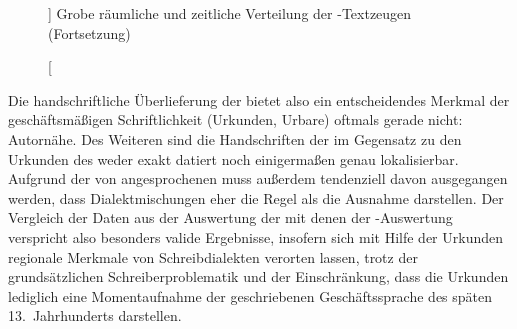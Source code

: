 {\begin{landscape}
\begin{figure}
\ContinuedFloat
{}
\caption%
	[]
	{Grobe räumliche und zeitliche Verteilung der \KC{}-Textzeugen
		(Fortsetzung)\nocite{wiesinger1983:rede}
	}
\end{figure}
\end{landscape}%
}

Die handschriftliche Überlieferung der \KC{} bietet also ein
entscheidendes Merkmal der geschäftsmäßigen Schriftlichkeit (Urkunden, Urbare)
oftmals gerade nicht: Autornähe. Des Weiteren sind die Handschriften der
\KC{} im Gegensatz zu den Urkunden des \CAO{} weder exakt datiert
noch einigermaßen genau lokalisierbar. Aufgrund der von
\citet[1310]{wegera2000} angesprochenen  muss außerdem
tendenziell davon ausgegangen werden, dass Dialekt\-mischungen eher die Regel
als die Ausnahme darstellen. Der Vergleich der Daten aus der Auswertung der
\KC{} mit denen der \CAO{}-Auswertung verspricht also besonders
valide Ergebnisse, insofern sich mit Hilfe der Urkunden regionale Merkmale von
Schreibdialekten verorten lassen, trotz der grundsätzlichen
Schreiberproblematik und der Einschränkung, dass die Urkunden lediglich eine
Momentaufnahme der geschriebenen Geschäftssprache des späten 13.~Jahrhunderts
darstellen.

